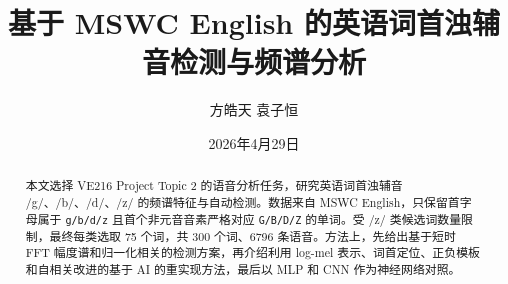 \documentclass[11pt,a4paper]{article}
\author{方皓天 \quad 袁子恒}
\title{基于 MSWC English 的英语词首浊辅音检测与频谱分析}
\date{2026年4月29日}
\begin{document}
\maketitle

\begin{abstract}
本文选择 VE216 Project Topic 2 的语音分析任务，研究英语词首浊辅音 /g/、/b/、/d/、/z/ 的频谱特征与自动检测。数据来自 MSWC English，只保留首字母属于 \texttt{g/b/d/z} 且首个非元音音素严格对应 \texttt{G/B/D/Z} 的单词。受 /z/ 类候选词数量限制，最终每类选取 75 个词，共 300 个词、6796 条语音。方法上，先给出基于短时 FFT 幅度谱和归一化相关的检测方案，再介绍利用 log-mel 表示、词首定位、正负模板和自相关改进的基于 AI 的重实现方法，最后以 MLP 和 CNN 作为神经网络对照。
\end{abstract}











\appendix

\end{document}
